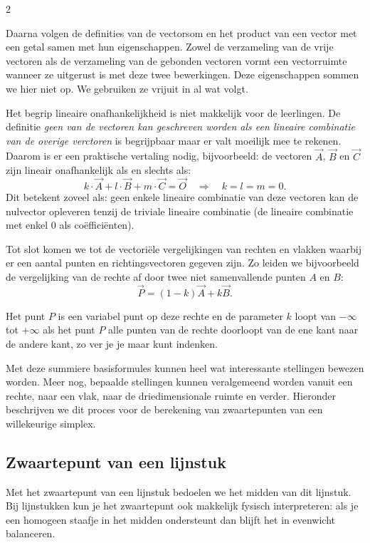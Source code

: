 \begin{multicols}{2}

Daarna volgen de definities van de vectorsom en het product van een vector met een getal samen met hun eigenschappen. Zowel de verzameling van de vrije vectoren als de verzameling van de gebonden vectoren vormt een vectorruimte wanneer ze uitgerust is met deze twee bewerkingen. Deze eigenschappen sommen we hier niet op. We gebruiken ze vrijuit in al wat volgt.

Het begrip lineaire onafhankelijkheid is niet makkelijk voor de leerlingen. De definitie \emph{geen van de vectoren kan geschreven worden als een lineaire combinatie van de overige verctoren} is begrijpbaar maar er valt moeilijk mee te rekenen. Daarom is er een praktische vertaling nodig, bijvoorbeeld: de vectoren $\vec{A}$, $\vec{B}$ en $\vec{C}$ zijn lineair onafhankelijk als en slechts als:
\[k \cdot \vec{A} + l \cdot \vec{B} + m \cdot \vec{C}= \vec{O} \quad \Rightarrow \quad k=l=m=0.\]
Dit betekent zoveel als: geen enkele lineaire combinatie van deze vectoren kan de nulvector opleveren tenzij de triviale lineaire combinatie (de lineaire combinatie met enkel 0 als coëfficiënten).

Tot slot komen we tot de vectoriële vergelijkingen van rechten en vlakken waarbij er een aantal punten en richtingsvectoren gegeven zijn. Zo leiden we bijvoorbeeld de vergelijking van de rechte af door twee niet samenvallende punten $A$ en $B$:
\[\vec{P}=(1-k) \vec{A} +k \vec{B}.\]

Het punt $P$ is een variabel punt op deze rechte en de parameter $k$ loopt van $-\infty$ tot $+\infty$ als het punt $P$ alle punten van de rechte doorloopt van de ene kant naar de andere kant, zo ver je je maar kunt indenken.

Met deze summiere basisformules kunnen heel wat interessante stellingen bewezen worden. Meer nog, bepaalde stellingen kunnen veralgemeend worden vanuit een rechte, naar een vlak, naar de driedimensionale ruimte en verder. Hieronder beschrijven we dit proces voor de berekening van zwaartepunten van een willekeurige simplex.

\subsection{Zwaartepunt van een lijnstuk}

Met het zwaartepunt van een lijnstuk bedoelen we het midden van dit lijnstuk. Bij lijnstukken kun je het zwaartepunt ook makkelijk fysisch interpreteren: als je een homogeen staafje in het midden ondersteunt dan blijft het in evenwicht balanceren.


\end{multicols}
